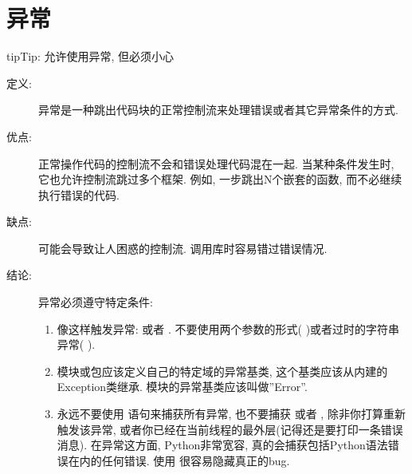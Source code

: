\documentclass[a4paper,10pt,english]{sphinxmanual}
\begin{document}
\section{异常}
\label{\detokenize{python_language_rules:id3}}
\begin{sphinxadmonition}{tip}{Tip:}
允许使用异常, 但必须小心
\end{sphinxadmonition}
\begin{description}
\item[{定义:}] \leavevmode
异常是一种跳出代码块的正常控制流来处理错误或者其它异常条件的方式.

\item[{优点:}] \leavevmode
正常操作代码的控制流不会和错误处理代码混在一起. 当某种条件发生时, 它也允许控制流跳过多个框架. 例如, 一步跳出N个嵌套的函数, 而不必继续执行错误的代码.

\item[{缺点:}] \leavevmode
可能会导致让人困惑的控制流. 调用库时容易错过错误情况.

\item[{结论:}] \leavevmode
异常必须遵守特定条件:
\begin{enumerate}
\item {} 
像这样触发异常:  或者  . 不要使用两个参数的形式(  )或者过时的字符串异常(  ).

\item {} 
模块或包应该定义自己的特定域的异常基类, 这个基类应该从内建的Exception类继承. 模块的异常基类应该叫做”Error”.
\begin{quote}

%
\begin{sphinxVerbatim}[commandchars=\\\{\}]
 
\end{sphinxVerbatim}
\end{quote}

\item {} 
永远不要使用  语句来捕获所有异常, 也不要捕获  或者  , 除非你打算重新触发该异常, 或者你已经在当前线程的最外层(记得还是要打印一条错误消息). 在异常这方面, Python非常宽容,  真的会捕获包括Python语法错误在内的任何错误. 使用  很容易隐藏真正的bug.


\end{enumerate}
\end{description}
\end{document}
